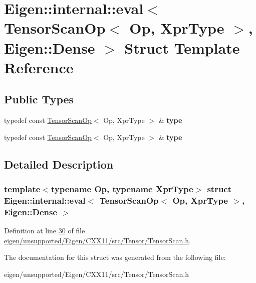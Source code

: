 \hypertarget{struct_eigen_1_1internal_1_1eval_3_01_tensor_scan_op_3_01_op_00_01_xpr_type_01_4_00_01_eigen_1_1_dense_01_4}{}\section{Eigen\+:\+:internal\+:\+:eval$<$ Tensor\+Scan\+Op$<$ Op, Xpr\+Type $>$, Eigen\+:\+:Dense $>$ Struct Template Reference}
\label{struct_eigen_1_1internal_1_1eval_3_01_tensor_scan_op_3_01_op_00_01_xpr_type_01_4_00_01_eigen_1_1_dense_01_4}
\subsection*{Public Types}
\begin{DoxyCompactItemize}
\item 
\mbox{\label{struct_eigen_1_1internal_1_1eval_3_01_tensor_scan_op_3_01_op_00_01_xpr_type_01_4_00_01_eigen_1_1_dense_01_4_abb119e04564c58c5b87d2c2def2199fe}} 
typedef const \hyperlink{class_eigen_1_1_tensor_scan_op}{Tensor\+Scan\+Op}$<$ Op, Xpr\+Type $>$ \& {\bfseries type}
\item 
\mbox{\label{struct_eigen_1_1internal_1_1eval_3_01_tensor_scan_op_3_01_op_00_01_xpr_type_01_4_00_01_eigen_1_1_dense_01_4_abb119e04564c58c5b87d2c2def2199fe}} 
typedef const \hyperlink{class_eigen_1_1_tensor_scan_op}{Tensor\+Scan\+Op}$<$ Op, Xpr\+Type $>$ \& {\bfseries type}
\end{DoxyCompactItemize}


\subsection{Detailed Description}
\subsubsection*{template$<$typename Op, typename Xpr\+Type$>$\newline
struct Eigen\+::internal\+::eval$<$ Tensor\+Scan\+Op$<$ Op, Xpr\+Type $>$, Eigen\+::\+Dense $>$}



Definition at line \hyperlink{eigen_2unsupported_2_eigen_2_c_x_x11_2src_2_tensor_2_tensor_scan_8h_source_l00030}{30} of file \hyperlink{eigen_2unsupported_2_eigen_2_c_x_x11_2src_2_tensor_2_tensor_scan_8h_source}{eigen/unsupported/\+Eigen/\+C\+X\+X11/src/\+Tensor/\+Tensor\+Scan.\+h}.



The documentation for this struct was generated from the following file\+:\begin{DoxyCompactItemize}
\item 
eigen/unsupported/\+Eigen/\+C\+X\+X11/src/\+Tensor/\+Tensor\+Scan.\+h\end{DoxyCompactItemize}
